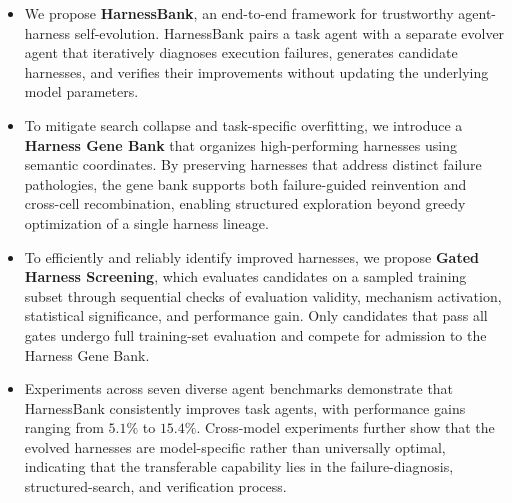 \begin{itemize}[leftmargin=*]
\item We propose \textbf{HarnessBank}, an end-to-end framework for trustworthy agent-harness self-evolution. HarnessBank pairs a task agent with a separate evolver agent that iteratively diagnoses execution failures, generates candidate harnesses, and verifies their improvements without updating the underlying model parameters.

\item To mitigate search collapse and task-specific overfitting, we introduce a \textbf{Harness Gene Bank} that organizes high-performing harnesses using semantic coordinates. By preserving harnesses that address distinct failure pathologies, the gene bank supports both failure-guided reinvention and cross-cell recombination, enabling structured exploration beyond greedy optimization of a single harness lineage.

\item To efficiently and reliably identify improved harnesses, we propose \textbf{Gated Harness Screening}, which evaluates candidates on a sampled training subset through sequential checks of evaluation validity, mechanism activation, statistical significance, and performance gain. Only candidates that pass all gates undergo full training-set evaluation and compete for admission to the Harness Gene Bank.

\item  Experiments across seven diverse agent benchmarks demonstrate that HarnessBank consistently improves task agents, with performance gains ranging from $5.1\%$ to $15.4\%$. Cross-model experiments further show that the evolved harnesses are model-specific rather than universally optimal, indicating that the transferable capability lies in the failure-diagnosis, structured-search, and verification process.
\end{itemize}